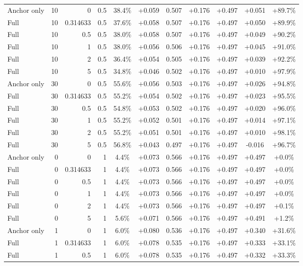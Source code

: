 \begin{table}[htbp]
\begin{tabular}{lrrrccccccc}
Anchor only & 10 & 0 & 0.5 & 38.4\% & +0.059 & 0.507 & +0.176 & +0.497 & +0.051 & +89.7\% \\
Full & 10 & 0.314633 & 0.5 & 37.6\% & +0.058 & 0.507 & +0.176 & +0.497 & +0.050 & +89.9\% \\
Full & 10 & 0.5 & 0.5 & 38.0\% & +0.058 & 0.507 & +0.176 & +0.497 & +0.049 & +90.2\% \\
Full & 10 & 1 & 0.5 & 38.0\% & +0.056 & 0.506 & +0.176 & +0.497 & +0.045 & +91.0\% \\
Full & 10 & 2 & 0.5 & 36.4\% & +0.054 & 0.505 & +0.176 & +0.497 & +0.039 & +92.2\% \\
Full & 10 & 5 & 0.5 & 34.8\% & +0.046 & 0.502 & +0.176 & +0.497 & +0.010 & +97.9\% \\
Anchor only & 30 & 0 & 0.5 & 55.6\% & +0.056 & 0.503 & +0.176 & +0.497 & +0.026 & +94.8\% \\
Full & 30 & 0.314633 & 0.5 & 55.2\% & +0.054 & 0.502 & +0.176 & +0.497 & +0.023 & +95.5\% \\
Full & 30 & 0.5 & 0.5 & 54.8\% & +0.053 & 0.502 & +0.176 & +0.497 & +0.020 & +96.0\% \\
Full & 30 & 1 & 0.5 & 55.2\% & +0.052 & 0.501 & +0.176 & +0.497 & +0.014 & +97.1\% \\
Full & 30 & 2 & 0.5 & 55.2\% & +0.051 & 0.501 & +0.176 & +0.497 & +0.010 & +98.1\% \\
Full & 30 & 5 & 0.5 & 56.8\% & +0.043 & 0.497 & +0.176 & +0.497 & -0.016 & +96.7\% \\
Anchor only & 0 & 0 & 1 & 4.4\% & +0.073 & 0.566 & +0.176 & +0.497 & +0.497 & +0.0\% \\
Full & 0 & 0.314633 & 1 & 4.4\% & +0.073 & 0.566 & +0.176 & +0.497 & +0.497 & +0.0\% \\
Full & 0 & 0.5 & 1 & 4.4\% & +0.073 & 0.566 & +0.176 & +0.497 & +0.497 & +0.0\% \\
Full & 0 & 1 & 1 & 4.4\% & +0.073 & 0.566 & +0.176 & +0.497 & +0.497 & +0.0\% \\
Full & 0 & 2 & 1 & 4.4\% & +0.073 & 0.566 & +0.176 & +0.497 & +0.497 & +0.1\% \\
Full & 0 & 5 & 1 & 5.6\% & +0.071 & 0.566 & +0.176 & +0.497 & +0.491 & +1.2\% \\
Anchor only & 1 & 0 & 1 & 6.0\% & +0.080 & 0.536 & +0.176 & +0.497 & +0.340 & +31.6\% \\
Full & 1 & 0.314633 & 1 & 6.0\% & +0.078 & 0.535 & +0.176 & +0.497 & +0.333 & +33.1\% \\
Full & 1 & 0.5 & 1 & 6.0\% & +0.078 & 0.535 & +0.176 & +0.497 & +0.332 & +33.3\% \\

\end{tabular}
\end{table}
